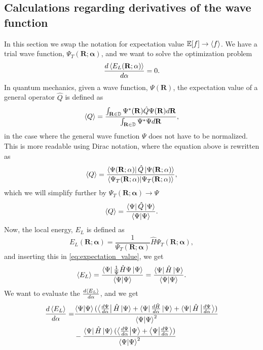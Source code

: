\subsection{Calculations regarding derivatives of the wave function}
In this section we swap the notation for expectation value $\mathbb{E}[f]\to\expval{f}$. 
We have a trial wave function, $\Psi_T(\mathbf{R}; \mathbf{\alpha})$, and we want to solve the optimization problem 
\begin{equation*}
    \frac{d\expval{E_L(\mathbf{R}; \mathbf{\alpha})}}{d\mathbf{\alpha}} = 0. 
\end{equation*}
In quantum mechanics, given a wave function, $\Psi(\mathbf{R})$, the expectation value of a general operator $\hat{Q}$ is defined as 
\begin{equation*}
    \expval{Q} = \frac{\int_{\mathbf{R}\in\mathbb{D}}\Psi^*(\mathbf{R})\hat{Q}\Psi(\mathbf{R})d\mathbf{R}}{\int_{\mathbf{R}\in\mathbb{D}}\Psi^*\Psi d\mathbf{R}}, 
\end{equation*}
in the case where the general wave function $\Psi$ does not have to be normalized. 
This is more readable using Dirac notation, where the equation above is rewritten as 
\begin{equation*}
    \expval{Q} = \frac{\bra{\Psi(\mathbf{R}; \mathbf{\alpha})}\hat{Q}\ket{\Psi(\mathbf{R};\mathbf{\alpha})}}{\braket{\Psi_T(\mathbf{R}; \mathbf{\alpha})}{\Psi_T(\mathbf{R}; \mathbf{\alpha})}}, 
\end{equation*}
which we will simplify further by $\Psi_T(\mathbf{R}; \mathbf{\alpha})\to\Psi$ 
\begin{equation}\label{eq:expectation_value}
    \expval{Q} = \frac{\bra{\Psi}\hat{Q}\ket{\Psi}}{\braket{\Psi}}.
\end{equation}
Now, the local energy, $E_L$ is defined as 
\begin{equation*}
    E_L(\mathbf{R}; \mathbf{\alpha}) = \frac{1}{\Psi_T(\mathbf{R}; \mathbf{\alpha})}\hat{H}\Psi_T(\mathbf{R}; \mathbf{\alpha}),  
\end{equation*}
and inserting this in \ref{eq:expectation_value}, we get
\begin{equation*}
    \expval{E_L} = \frac{\bra{\Psi}\frac{1}{\Psi}\hat{H}\Psi\ket{\Psi}}{\braket{\Psi}}=\frac{\bra{\Psi}\hat{H}\ket{\Psi}}{\braket{\Psi}}.  
\end{equation*}
We want to evaluate the $\frac{d\expval{E_L}}{d\mathbf{\alpha}}$, and we get 
\begin{equation*}
    \begin{split}
        \frac{d\expval{E_L}}{d\alpha} =& \frac{\braket{\Psi}(\bra{\frac{d\Psi}{d\mathbf{\alpha}}}\hat{H}\ket{\Psi}+\bra{\Psi}\frac{d\hat{H}}{d\mathbf{\alpha}}\ket{\Psi}+\bra{\Psi}\hat{H}\ket{\frac{d\Psi}{d\mathbf{\alpha}}})}{\braket{\Psi}^2}\\
        &-\frac{\bra{\Psi}\hat{H}\ket{\Psi}(\bra{\frac{d\Psi}{d\mathbf{\alpha}}}\ket{\Psi}+\bra{\Psi}\ket{\frac{d\Psi}{d\mathbf{\alpha}}})}{\braket{\Psi}^2}
    \end{split}
\end{equation*}

